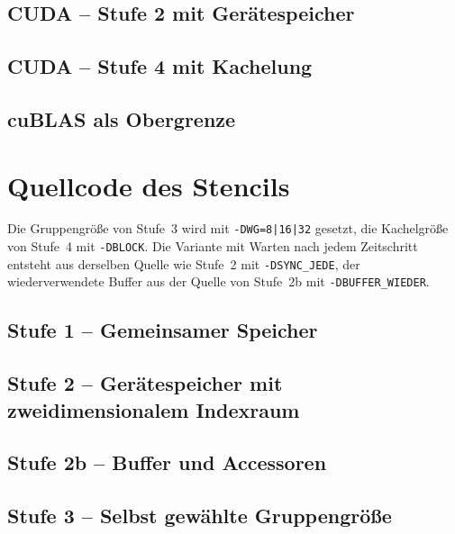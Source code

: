 \documentclass[12pt,a4paper]{article}
\begin{document}
\subsection{CUDA -- Stufe 2 mit Gerätespeicher}


\subsection{CUDA -- Stufe 4 mit Kachelung}


\subsection{cuBLAS als Obergrenze}


\newpage
\section{Quellcode des Stencils}\label{sec:anhang-stencil}

Die Gruppengröße von Stufe~3 wird mit \texttt{-DWG=8|16|32} gesetzt, die
Kachelgröße von Stufe~4 mit \texttt{-DBLOCK}. Die Variante mit Warten nach
jedem Zeitschritt entsteht aus derselben Quelle wie Stufe~2 mit
\texttt{-DSYNC\_JEDE}, der wiederverwendete Buffer aus der Quelle von
Stufe~2b mit \texttt{-DBUFFER\_WIEDER}.

\subsection{Stufe 1 -- Gemeinsamer Speicher}


\subsection{Stufe 2 -- Gerätespeicher mit zweidimensionalem Indexraum}


\subsection{Stufe 2b -- Buffer und Accessoren}


\subsection{Stufe 3 -- Selbst gewählte Gruppengröße}

\end{document}
